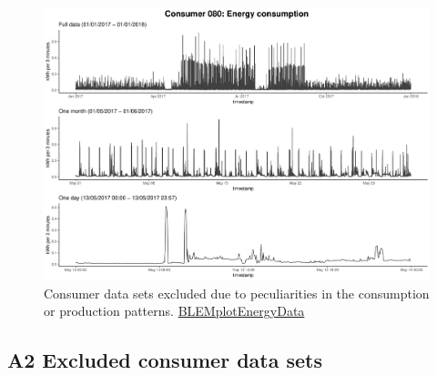 \begin{centering}
\begin{figure}[!htbp]
        \includegraphics[width=\textwidth-0.85cm]{thesis/graphs/timeseries/c080_cons.pdf}
        \caption[Consumer data sets excluded due to peculiarities in the consumption patterns]{Consumer data sets excluded due to peculiarities in the consumption or production patterns. \quantnet\href{https://github.com/QuantLet/BLEM/tree/master/BLEMplotEnergyData}{BLEMplotEnergyData}}
\end{figure}
\end{centering}


\subsection*{\hypertarget{AppA2:Figures:Excludedp}{A2} Excluded consumer data sets}\label{AppA2:Figures:Excludedp}

